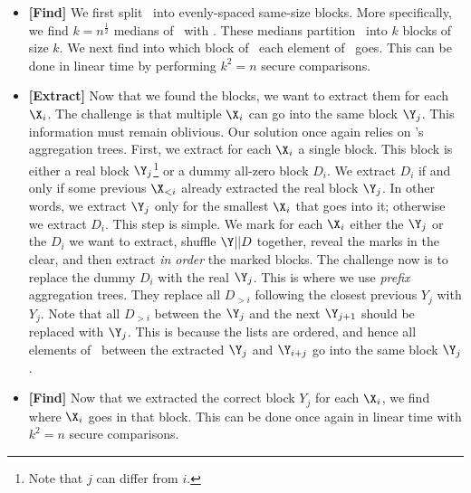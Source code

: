\begin{itemize}
    \item \textbf{[Find]} We first split \Y\ into evenly-spaced same-size blocks. More specifically, we find $k=n^{\frac{1}{2}}$ medians of \Y\ with \med. These medians partition \Y\ into $k$ blocks of size $k$. We next find into which block of \Y\ each element of \X\ goes. This can be done in linear time by performing $k^2 = n$ secure comparisons.
    \item \textbf{[Extract]} Now that we found the blocks, we want to extract them for each $\X_i$. The challenge is that multiple $\X_i$ can go into the same block $\Y_j$. 
    This information must remain oblivious. Our solution once again relies on \cite{CCS:BDGRR22}'s aggregation trees. 
    First, we extract for each $\X_i$ a single block. This block is either a real block $\Y_j$\footnote{Note that $j$ can differ from $i$.} or a dummy all-zero block $D_i$. We extract $D_i$ if and only if some previous $\X_{<i}$ already extracted the real block $\Y_j$. In other words, we extract $\Y_j$ only for the smallest $\X_i$ that goes into it; otherwise we extract $D_i$.
    This step is simple. We mark for each $\X_i$ either the $\Y_j$ or the $D_i$ we want to extract, shuffle $\Y || D$ together, reveal the marks in the clear, and then extract \emph{in order} the marked blocks. 
    The challenge now is to replace the dummy $D_i$ with the real $\Y_j$. This is where we use \emph{prefix} aggregation trees. They replace all $D_{>i}$ following the closest previous $Y_j$ with $Y_j$. Note that all $D_{>i}$ between the $\Y_j$ and the next $\Y_{j+1}$ should be replaced with $\Y_j$. This is because the lists are ordered, and hence all elements of \X\ between the extracted $\Y_j$ and $\Y_{i+j}$ go into the same block $\Y_j$.
    \item \textbf{[Find]} Now that we extracted the correct block $Y_j$ for each $\X_i$, we find where $\X_i$ goes in that block. This can be done once again in linear time with $k^2 = n$ secure comparisons.

\end{itemize}
